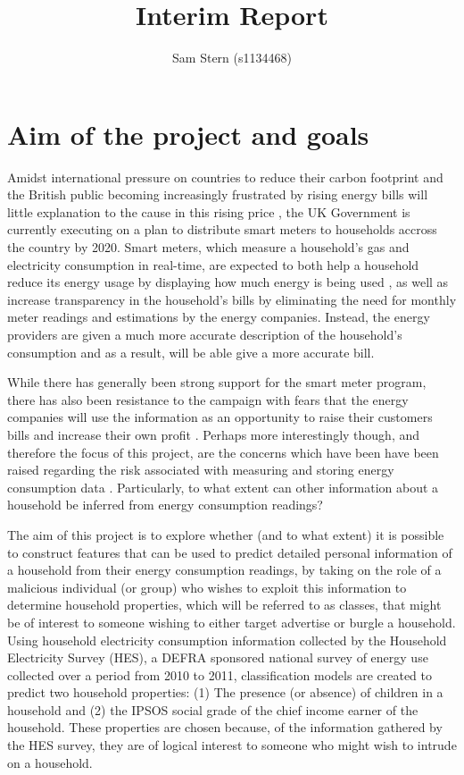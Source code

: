 \documentclass[12pt,a4paper]{article}
\author{Sam Stern (s1134468)}
\title {Interim Report}
\begin{document}
\maketitle
\section*{Aim of the project and goals}

Amidst international pressure on countries to reduce their carbon footprint \cite{E-comm} and the British public becoming increasingly frustrated by rising energy bills will little explanation to the cause in this rising price \cite{E-spending}, the UK Government is currently executing on a plan to distribute smart meters to households accross the country by 2020. Smart meters, which measure a household's gas and electricity consumption in real-time, are expected to both help a household reduce its energy usage by displaying how much energy is being used , as well as increase transparency in the household's bills by eliminating the need for monthly meter readings and estimations by the energy companies. Instead, the energy providers are given a much more accurate description of the household's consumption and as a result, will be able give a more accurate bill.

While there has generally been strong support for the smart meter program, there has also been resistance to the campaign with fears that the energy companies will use the information as an opportunity to raise their customers bills and increase their own profit \cite{stop}. Perhaps more interestingly though, and therefore the focus of this project, are the concerns which have been have been raised regarding the risk associated with measuring and storing energy consumption data \cite{Quinn} \cite{LMW}. Particularly, to what extent can other information about a household be inferred from energy consumption readings?

The aim of this project is to explore whether (and to what extent) it is possible to construct features that can be used to predict detailed personal information of a household from their energy consumption readings, by taking on the role of a malicious individual (or group) who wishes to exploit this information to determine household properties, which will be referred to as classes, that might be of interest to someone wishing to either target advertise or burgle a household. Using household electricity consumption information collected by the Household Electricity Survey (HES), a DEFRA sponsored national survey of energy use collected over a period from 2010 to 2011, classification models are created to predict two household properties: (1) The presence (or absence) of children in a household and (2) the IPSOS social grade of the chief income earner of the household. These properties are chosen because, of the information gathered by the HES survey, they are of logical interest to someone who might wish to intrude on a household.
\newline
\end{document}

